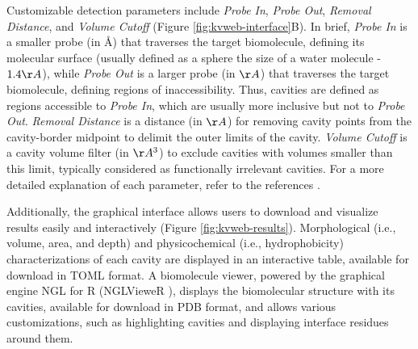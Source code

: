 \documentclass[Ingles]{phdthesis}
\def\ie{i.e.\onedot}
\begin{document}
Customizable detection parameters include \textit{Probe In}, \textit{Probe Out}, \textit{Removal Distance}, and \textit{Volume Cutoff} (Figure \ref{fig:kvweb-interface}B). In brief, \textit{Probe In} is a smaller probe (in \AA) that traverses the target biomolecule, defining its molecular surface (usually defined as a sphere the size of a water molecule - $1.4 \AA$), while \textit{Probe Out} is a larger probe (in $\AA$) that traverses the target biomolecule, defining regions of inaccessibility. Thus, cavities are defined as regions accessible to \textit{Probe In}, which are usually more inclusive but not to \textit{Probe Out}. \textit{Removal Distance} is a distance (in $\AA$) for removing cavity points from the cavity-border midpoint to delimit the outer limits of the cavity. \textit{Volume Cutoff} is a cavity volume filter (in $\AA^3$) to exclude cavities with volumes smaller than this limit, typically considered as functionally irrelevant cavities. For a more detailed explanation of each parameter, refer to the references \cite{oliveira2014,guerra2019,guerra2020,guerra2021,guerra2023A}.
 
Additionally, the graphical interface allows users to download and visualize results easily and interactively (Figure \ref{fig:kvweb-results}). Morphological (\ie, volume, area, and depth) and physicochemical (\ie, hydrophobicity) characterizations of each cavity are displayed in an interactive table, available for download in TOML format. A biomolecule viewer, powered by the graphical engine NGL for R (NGLVieweR \cite{nglviewerr}), displays the biomolecular structure with its cavities, available for download in \acs{PDB} format, and allows various customizations, such as highlighting cavities and displaying interface residues around them.
\end{document}
